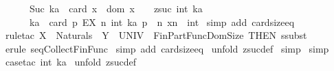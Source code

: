\begin{isabellebody}
\ \ \ \ \ \ {\isacharparenleft}{\isacharparenleft}Suc\ ka{\isacharparenright}\ {\isacharequal}\ {\isacharparenleft}card\ x{\isacharparenright}{\isacharparenright}\ {\isacharsemicolon}\ {\isacharparenleft}{\isacharparenleft}dom\ x{\isacharparenright}\ {\isacharequal}\ {\isacharparenleft}\ {}{\isachardot}{\isachardot}\ zsuc\ {\isacharparenleft}int\ ka{\isacharparenright}{\isacharparenright}{\isacharparenright}{\isacharbar}{\isacharbrackright}\ {\isacharequal}{\isacharequal}{\isachargreater}\ \ \isanewline
\ \ \ \ \ \ {\isacharparenleft}ka\ {\isacharequal}\ card\ {\isacharbraceleft}p{\isachardot}\ EX\ n{\isacharcolon}\ {}{\isachardot}{\isachardot}int\ ka{\isachardot}\ p\ {\isacharequal}\ {\isacharparenleft}n{\isacharcomma}\ x{\isacharpercent}{\isacharcircum}n\ {\isacharplus}\ {}{\isacharcolon}{\isacharcolon}int{\isacharparenright}{\isacharbraceright}{\isacharparenright}{\isachardoublequoteclose}\isanewline
%
\isadelimproof
%
\endisadelimproof
%
\isatagproof
{}\isamarkupfalse%
\ {\isacharparenleft}simp\ add{\isacharcolon}\ card{\isacharunderscore}size{\isacharunderscore}eq{\isacharparenright}\isanewline
{}\isamarkupfalse%
\ {\isacharparenleft}rule{\isacharunderscore}tac\ X{}\ {\isacharequal}\ {\isachardoublequoteopen}Naturals{\isachardoublequoteclose}\ \ Y{}\ {\isacharequal}\ {\isachardoublequoteopen}UNIV{\isachardoublequoteclose}\ \ Fin{\isacharunderscore}Part{\isacharunderscore}Func{\isacharunderscore}Dom{\isacharunderscore}Size\ {\isacharbrackleft}THEN\ ssubst{\isacharbrackright}{\isacharparenright}\isanewline
{}\isamarkupfalse%
\ {\isacharparenleft}erule\ seq{\isacharunderscore}Collect{\isacharunderscore}Fin{\isacharunderscore}Func{\isacharparenright}\isanewline
{}\isamarkupfalse%
\ {\isacharparenleft}simp\ add{\isacharcolon}\ card{\isacharunderscore}size{\isacharunderscore}eq{\isacharparenright}\isanewline
{}\isamarkupfalse%
\ {\isacharparenleft}unfold\ zsuc{\isacharunderscore}def{\isacharparenright}\isanewline
{}\isamarkupfalse%
\ simp\isanewline
{}\isamarkupfalse%
\ simp\isanewline
{}\isamarkupfalse%
\ {\isacharparenleft}case{\isacharunderscore}tac\ {\isachardoublequoteopen}{}{\isacharless}{\isacharequal}{\isacharparenleft}int\ ka{\isacharparenright}{\isachardoublequoteclose}{\isacharparenright}\isanewline
{}\isamarkupfalse%
\ {\isacharparenleft}unfold\ zsuc{\isacharunderscore}def{\isacharparenright}\isanewline

\end{isabellebody}
